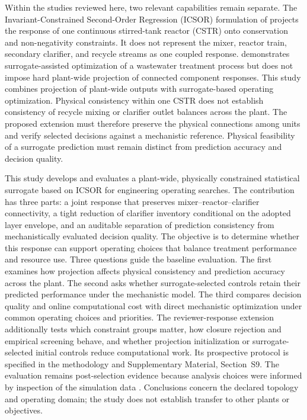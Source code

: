 \documentclass[a4paper,fleqn]{cas-sc}
\begin{document}
Within the studies reviewed here, two relevant capabilities remain separate. The Invariant-Constrained Second-Order Regression (ICSOR) formulation of \citet{Selerio2026} projects the response of one continuous stirred-tank reactor (CSTR) onto conservation and non-negativity constraints. It does not represent the mixer, reactor train, secondary clarifier, and recycle streams as one coupled response. \citet{He2023} demonstrates surrogate-assisted optimization of a wastewater treatment process but does not impose hard plant-wide projection of connected component responses. This study combines projection of plant-wide outputs with surrogate-based operating optimization. Physical consistency within one CSTR does not establish consistency of recycle mixing or clarifier outlet balances across the plant. The proposed extension must therefore preserve the physical connections among units and verify selected decisions against a mechanistic reference. Physical feasibility of a surrogate prediction must remain distinct from prediction accuracy and decision quality.

This study develops and evaluates a plant-wide, physically constrained statistical surrogate based on ICSOR for engineering operating searches. The contribution has three parts: a joint response that preserves mixer--reactor--clarifier connectivity, a tight reduction of clarifier inventory conditional on the adopted layer envelope, and an auditable separation of prediction consistency from mechanistically evaluated decision quality. The objective is to determine whether this response can support operating choices that balance treatment performance and resource use. Three questions guide the baseline evaluation. The first examines how projection affects physical consistency and prediction accuracy across the plant. The second asks whether surrogate-selected controls retain their predicted performance under the mechanistic model. The third compares decision quality and online computational cost with direct mechanistic optimization under common operating choices and priorities. The reviewer-response extension additionally tests which constraint groups matter, how closure rejection and empirical screening behave, and whether projection initialization or surrogate-selected initial controls reduce computational work. Its prospective protocol is specified in the methodology and Supplementary Material, Section~S9. The evaluation remains post-selection evidence because analysis choices were informed by inspection of the simulation data \citep{Kaufman2012}. Conclusions concern the declared topology and operating domain; the study does not establish transfer to other plants or objectives.
\end{document}
